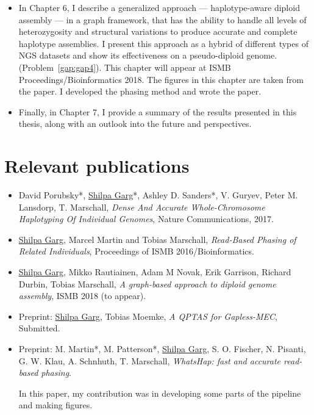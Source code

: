 \begin{itemize}
 \item In Chapter 6, I describe a generalized approach --- haplotype-aware diploid assembly --- in a graph framework, that has the ability to handle all levels of heterozygosity and structural variations to produce accurate and complete haplotype assemblies.
 I present this approach as a hybrid of different types of NGS datasets and show its effectiveness on a pseudo-diploid genome. (Problem~\ref{gap:gap4}).
 This chapter will appear at ISMB Proceedings/Bioinformatics 2018. The figures in this chapter are taken from the paper. I developed the phasing method and wrote the paper.
 \item Finally, in Chapter 7, I provide a summary of the results presented in this thesis, along with an outlook into the future and perspectives.
\end{itemize}

\section{Relevant publications}
\begin{itemize}
 \item David Porubsky*, \underline{Shilpa Garg}*, Ashley D. Sanders*, V. Guryev, Peter M. Lansdorp, T. Marschall,
\textit{Dense And Accurate Whole-Chromosome Haplotyping Of Individual Genomes}, Nature Communications, 2017.


\item \underline{Shilpa Garg}, Marcel Martin and Tobias Marschall, \textit{Read-Based Phasing of Related Individuals},
Proceedings of ISMB 2016/Bioinformatics.
\item \underline{Shilpa Garg}, Mikko Rautiainen, Adam M Novak, Erik Garrison, Richard Durbin, Tobias Marschall, \textit{A graph-based approach to diploid genome assembly}, ISMB 2018 (to appear).
\item Preprint: \underline{Shilpa Garg}, Tobias Moemke, \textit{A QPTAS for Gapless-MEC}, Submitted.
\item Preprint: M. Martin*, M. Patterson*, \underline{Shilpa Garg}, S. O. Fischer, N. Pisanti, G. W. Klau, A. Schnhuth, T.
Marschall, \textit{WhatsHap: fast and accurate read-based phasing}.

In this paper, my contribution was in developing some parts of the pipeline and making figures.
\end{itemize}


